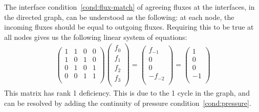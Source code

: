 \documentclass[10pt,twocolumn,letterpaper]{article}
\begin{document}
The interface condition~\ref{cond:flux-match} of agreeing fluxes at the interfaces, 
in the directed graph, 
can be understood as the following: 
at each node, the incoming fluxes should be equal to outgoing fluxes. 
Requiring this to be true at all nodes gives us
the following linear system of equations:
\begin{align}
  \begin{pmatrix}
    1 & 1 & 0 & 0\\
    1 & 0 & 1 & 0\\
    0 & 1 & 0 & 1\\
    0 & 0 & 1 & 1\\
  \end{pmatrix}
  \begin{pmatrix}
    f_0\\
    f_1\\
    f_2\\
    f_3\\
  \end{pmatrix}
  =
  \begin{pmatrix}
    f_{-1}\\
    0\\
    0\\
    -f_{-2}\\
  \end{pmatrix}
  =
  \begin{pmatrix}
    1\\
    0\\
    0\\
    -1\\
  \end{pmatrix} \label{eq:interface-flux-match}
\end{align}
This matrix has rank 1 deficiency. 
This is due to the 1 cycle in the graph, 
and can be resolved by adding the continuity of pressure condition~\ref{cond:pressure}. 
\end{document}
